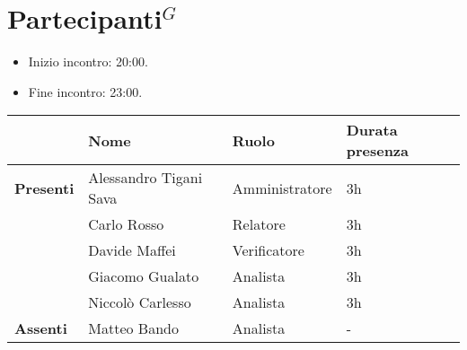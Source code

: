 \section*{\gls{Partecipanti}$^G$}

\begin{itemize}
	\item Inizio incontro: 20:00.
	\item Fine incontro: 23:00.
\end{itemize}


\begin{center}
	{\renewcommand{\arraystretch}{1.5}
		\begin{tabular}{llll}
			                  & \textbf{Nome}          & \textbf{Ruolo} & \textbf{Durata presenza} \\
			\hline
			\textbf{Presenti} & Alessandro Tigani Sava & Amministratore & 3h                       \\
			                  & Carlo Rosso            & Relatore       & 3h                       \\
			                  & Davide Maffei          & Verificatore   & 3h                       \\
			                  & Giacomo Gualato        & Analista       & 3h                       \\
			                  & Niccolò Carlesso       & Analista       & 3h                       \\
			\hline
			\textbf{Assenti}  & Matteo Bando           & Analista       & -                        \\
		\end{tabular}
	}
\end{center}
